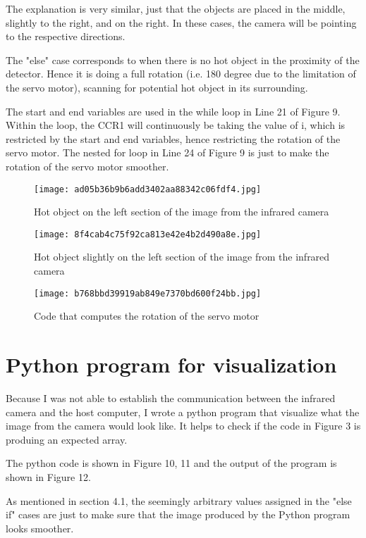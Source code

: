 \documentclass[12pt]{article}
\begin{document}
The explanation is very similar, just that the objects are placed in the middle, slightly to the right, and on the right. In these cases, the camera will be pointing to the respective directions.

The "else" case corresponds to when there is no hot object in the proximity of the detector. Hence it is doing a full rotation (i.e. 180 degree due to the limitation of the servo motor), scanning for potential hot object in its surrounding.

The start and end variables are used in the while loop in Line 21 of Figure 9. Within the loop, the CCR1 will continuously be taking the value of i, which is restricted by the start and end variables, hence restricting the rotation of the servo motor. The nested for loop in Line 24 of Figure 9 is just to make the rotation of the servo motor smoother.

\begin{figure}[h]
\texttt{[image: ad05b36b9b6add3402aa88342c06fdf4.jpg]}
\centering
\caption{Hot object on the left section of the image from the infrared camera}
\end{figure}

\begin{figure}[h]
\texttt{[image: 8f4cab4c75f92ca813e42e4b2d490a8e.jpg]}
\centering
\caption{Hot object slightly on the left section of the image from the infrared camera}
\end{figure}

\begin{figure}[h]
\texttt{[image: b768bbd39919ab849e7370bd600f24bb.jpg]}
\centering
\caption{Code that computes the rotation of the servo motor}
\end{figure}

\section {Python program for visualization}
Because I was not able to establish the communication between the infrared camera and the host computer, I wrote a python program that visualize what the image from the camera would look like. It helps to check if the code in Figure 3 is produing an expected array.

The python code is shown in Figure 10, 11 and the output of the program is shown in Figure 12.

As mentioned in section 4.1, the seemingly arbitrary values assigned in the "else if" cases are just to make sure that the image produced by the Python program looks smoother.
\end{document}

